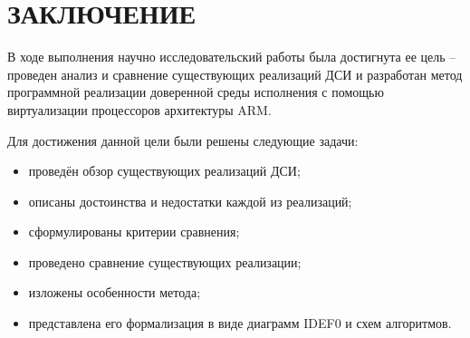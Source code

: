 \section*{ЗАКЛЮЧЕНИЕ}

В ходе выполнения научно исследовательский работы была достигнута ее цель -- проведен анализ и сравнение существующих реализаций ДСИ и разработан метод программной реализации доверенной среды исполнения с помощью виртуализации процессоров архитектуры ARM.

Для достижения данной цели были решены следующие задачи:

\begin{itemize}
	\item проведён обзор существующих реализаций ДСИ;
	\item описаны достоинства и недостатки каждой из реализаций;
	\item сформулированы критерии сравнения;
	\item проведено сравнение существующих реализации;
	\item изложены особенности метода;
	\item представлена его формализация в виде диаграмм IDEF0 и схем алгоритмов.
\end{itemize}

\pagebreak